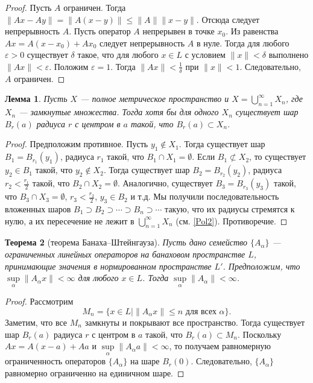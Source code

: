\documentclass[12pt, titlepage, oneside]{amsbook}
\newtheorem{theorem}{Теорема}[chapter]
\newtheorem{lemma}[theorem]{Лемма}
\theoremstyle{definition}
\theoremstyle{remark}
\begin{document}
\begin{proof}
Пусть $A$ ограничен. Тогда $\|Ax-Ay\|=\|A(x-y)\|\leq\|A\|\|x-y\|$. Отсюда следует непрерывность $A$. Пусть оператор $A$ непрерывен в точке $x_0$. Из равенства $Ax=A(x-x_0)+A x_0$ следует непрерывность $A$ в нуле. Тогда для любого $\varepsilon>0$ существует $\delta$ такое, что для любого $x\in L$ с условием $\|x\|<\delta$ выполнено $\|Ax\|<\varepsilon$. Положим $\varepsilon=1$. Тогда $\|Ax\|<\frac{1}{\delta}$ при $\|x\|<1$. Следовательно, $A$ ограничен.
\end{proof}

\begin{lemma}
\label{BerBan} Пусть $X$ --- полное метрическое пространство и $X=\bigcup\limits_{n=1}^{\infty} X_n$, где $X_n$ --- замкнутые множества. Тогда хотя бы для одного $X_n$ существует шар $B_r(a)$ радиуса $r$ с центром в $a$ такой, что $B_r(a)\subset X_n$.
\end{lemma}

\begin{proof}
Предположим противное. Пусть $y_1\not\in X_1$. Тогда существует шар $B_1=B_{r_1}(y_1)$, радиуса $r_1$ такой, что $B_1\cap X_1=\emptyset$. Если $B_1\not\subset X_2$, то существует $y_2\in B_1$ такой, что $y_2\not\in X_2$. Тогда существует шар $B_2=B_{r_2}(y_2)$, радиуса $r_2<\frac{r_1}{2}$ такой, что $B_2\cap X_2=\emptyset$. Аналогично, существует $B_3=B_{r_3}(y_3)$ такой, что $B_3\cap X_3=\emptyset$, $r_3<\frac{r_2}{2}$, $y_3\in B_2$ и т.д. Мы получили последовательность вложенных шаров $B_1\supset B_2\supset\cdots\supset B_n\supset\cdots$ такую, что их радиусы стремятся к нулю, а их пересечение не лежит в $\bigcup\limits_{n=1}^{\infty} X_n$ (см. \ref{Pol2}). Противоречие.
\end{proof}

\begin{theorem}[теорема Банаха--Штейнгауза]
\label{Ban-Sh}
Пусть дано семейство $\{A_{\alpha}\}$ --- ограниченных линейных операторов на банаховом пространстве $L$, принимающие значения в нормированном пространстве $L'$. Предположим, что $\sup\limits_{\alpha}\|A_{\alpha}x\|<\infty$ для любого $x\in L$. Тогда $\sup\limits_{\alpha}\|A_{\alpha}\|<\infty$.
\end{theorem}

\begin{proof}
Рассмотрим $$M_n=\{x\in L\mid \|A_{\alpha}x\|\leq n\text{ для всех $\alpha$}\}.$$ Заметим, что все $M_n$ замкнуты и покрывают все пространство. Тогда существует шар $B_r(a)$ радиуса $r$ с центром в $a$ такой, что $B_r(a)\subset M_n$. Поскольку $Ax=A(x-a)+Aa$ и $\sup\limits_{\alpha}\|A_{\alpha}a\|<\infty$, то получаем равномерную ограниченность операторов $\{A_{\alpha}\}$ на шаре $B_r(0)$. Следовательно, $\{A_{\alpha}\}$ равномерно ограниченно на единичном шаре.
\end{proof}
\end{document}
